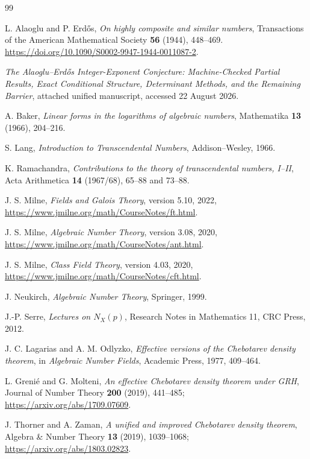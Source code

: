 \documentclass[11pt]{article}
\numberwithin{equation}{section}
\theoremstyle{definition}
\theoremstyle{remark}
\begin{document}
\begin{thebibliography}{99}

L. Alaoglu and P. Erd\H{o}s,
\emph{On highly composite and similar numbers},
Transactions of the American Mathematical Society \textbf{56} (1944), 448--469.
\url{https://doi.org/10.1090/S0002-9947-1944-0011087-2}.

\emph{The Alaoglu--Erd\H{o}s Integer-Exponent Conjecture: Machine-Checked Partial Results,
Exact Conditional Structure, Determinant Methods, and the Remaining Barrier},
attached unified manuscript, accessed 22 August 2026.

A. Baker,
\emph{Linear forms in the logarithms of algebraic numbers},
Mathematika \textbf{13} (1966), 204--216.

S. Lang,
\emph{Introduction to Transcendental Numbers},
Addison--Wesley, 1966.

K. Ramachandra,
\emph{Contributions to the theory of transcendental numbers, I--II},
Acta Arithmetica \textbf{14} (1967/68), 65--88 and 73--88.

J. S. Milne,
\emph{Fields and Galois Theory}, version 5.10, 2022,
\url{https://www.jmilne.org/math/CourseNotes/ft.html}.

J. S. Milne,
\emph{Algebraic Number Theory}, version 3.08, 2020,
\url{https://www.jmilne.org/math/CourseNotes/ant.html}.

J. S. Milne,
\emph{Class Field Theory}, version 4.03, 2020,
\url{https://www.jmilne.org/math/CourseNotes/cft.html}.

J. Neukirch,
\emph{Algebraic Number Theory},
Springer, 1999.

J.-P. Serre,
\emph{Lectures on \(N_X(p)\)},
Research Notes in Mathematics 11, CRC Press, 2012.

J. C. Lagarias and A. M. Odlyzko,
\emph{Effective versions of the Chebotarev density theorem},
in \emph{Algebraic Number Fields}, Academic Press, 1977, 409--464.

L. Greni\'e and G. Molteni,
\emph{An effective Chebotarev density theorem under GRH},
Journal of Number Theory \textbf{200} (2019), 441--485;
\url{https://arxiv.org/abs/1709.07609}.

J. Thorner and A. Zaman,
\emph{A unified and improved Chebotarev density theorem},
Algebra \& Number Theory \textbf{13} (2019), 1039--1068;
\url{https://arxiv.org/abs/1803.02823}.


\end{thebibliography}
\end{document}
